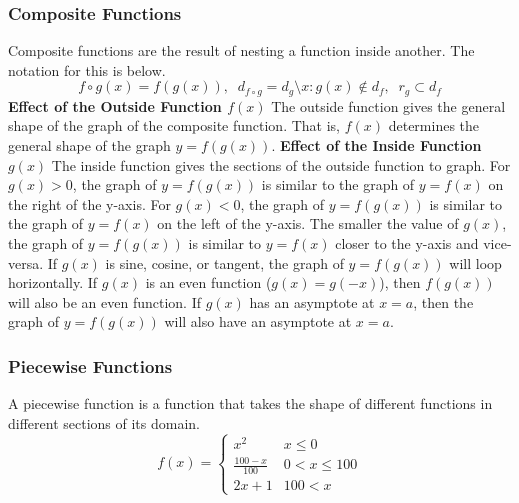 \documentclass{article}
\begin{document}
			\subsubsection{Composite Functions}
				Composite functions are the result of nesting a function inside another. The notation for this is below.
				\[f\circ g(x)=f(g(x)),\;\;d_{f\circ g}=d_g \setminus {x:g(x)\notin d_f},\;\;r_g\subset d_f\]
				\textbf{Effect of the Outside Function $f(x)$}\newline
				The outside function gives the general shape of the graph of the composite function. That is, $f(x)$ determines the general shape of the graph $y=f(g(x))$.\newline\newline
				\textbf{Effect of the Inside Function $g(x)$}\newline
				The inside function gives the sections of the outside function to graph.\newline
				For $g(x)>0$, the graph of $y=f(g(x))$ is similar to the graph of $y=f(x)$ on the right of the y-axis.\newline
				For $g(x)<0$, the graph of $y=f(g(x))$ is similar to the graph of $y=f(x)$ on the left of the y-axis.\newline\newline
				The smaller the value of $g(x)$, the graph of $y=f(g(x))$ is similar to $y=f(x)$ closer to the y-axis and vice-versa.\newline\newline
				If $g(x)$ is sine, cosine, or tangent, the graph of $y=f(g(x))$ will loop horizontally.\newline
				If $g(x)$ is an even function ($g(x)=g(-x)$), then $f(g(x))$ will also be an even function.\newline
				If $g(x)$ has an asymptote at $x=a$, then the graph of $y=f(g(x))$ will also have an asymptote at $x=a$.\newline\newline
			\subsubsection{Piecewise Functions}
				A piecewise function is a function that takes the shape of different functions in different sections of its domain.\newline
				\[
					f(x)=\begin{cases}
						x^2 & x\leq 0\\
						\frac{100-x}{100} & 0<x\leq 100 \\
						2x+1 & 100<x
					\end{cases}
				\]
\end{document}
